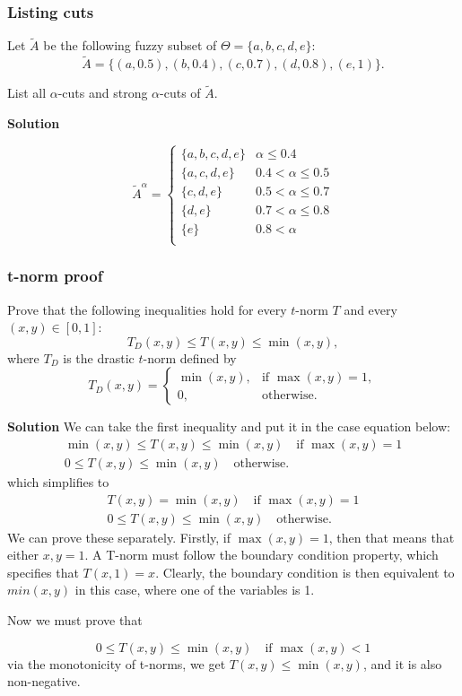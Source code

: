 \documentclass[11pt]{article}
\begin{document}
\subsubsection{Listing cuts}

Let $\tilde{A}$ be the following fuzzy subset of
$\Theta = \{a,b,c,d,e\}$:
\begin{equation}
    \tilde{A} = \{(a,0.5),(b,0.4),(c,0.7),(d,0.8),(e,1)\}.
\end{equation}

List all $\alpha$-cuts and strong $\alpha$-cuts of $\tilde{A}$.

\textbf{Solution}

\begin{equation}
    \tilde{A}^\alpha = 
    \begin{cases}
       \{ a,b,c,d,e \} & \alpha \leq 0.4 \\
       \{ a,c,d,e \} & 0.4 < \alpha \leq 0.5 \\
       \{ c,d,e \} & 0.5 < \alpha \leq 0.7 \\
       \{ d,e \} & 0.7 < \alpha \leq 0.8 \\
       \{ e \} & 0.8 < \alpha \\
    \end{cases}
\end{equation}

\subsubsection{t-norm proof}

Prove that the following inequalities hold for every $t$-norm $T$ and every
$(x,y) \in [0,1]$:
\begin{equation}
    T_D(x,y) \leq T(x,y) \leq \min(x,y),
\end{equation}
where $T_D$ is the drastic $t$-norm defined by
\begin{equation}
    T_D(x,y) =
    \begin{cases}
        \min(x,y), & \text{if } \max(x,y)=1,\\
        0, & \text{otherwise.}
    \end{cases}
\end{equation}

\textbf{Solution}
We can take the first inequality and put it in the case equation below:
\begin{gather}
    \min(x,y) \leq T(x,y) \leq \min(x,y) \quad \text{if } \max(x,y)=1 \\
    0 \leq T(x,y) \leq \min(x,y) \quad \text{otherwise.}
\end{gather}
which simplifies to
\begin{gather}
    T(x,y) = \min(x,y) \quad \text{if } \max(x,y)=1 \\
    0 \leq T(x,y) \leq \min(x,y) \quad \text{otherwise.}
\end{gather}
We can prove these separately.
Firstly, if $\max(x,y) = 1$, then that means that either $x,y = 1$.
A T-norm must follow the boundary condition property, which specifies that $T(x,1) = x$.
Clearly, the boundary condition is then equivalent to $min(x,y)$ in this case, where one of the variables is 1.

Now we must prove that 

\begin{equation}
    0 \leq T(x,y) \leq \min(x,y) \quad \text{if } \max(x,y) < 1
\end{equation}
via the monotonicity of t-norms, we get $T(x,y) \leq \min(x,y)$, and it is also non-negative.
\end{document}
